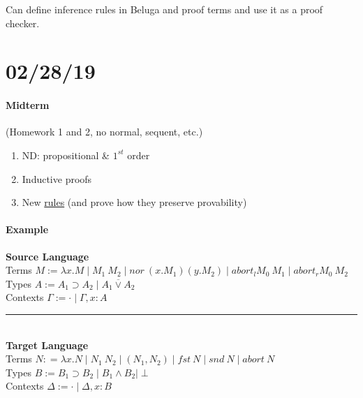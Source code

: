 \documentclass[12 pt]{article}
\begin{document}
       \DP

       Can define inference rules in Beluga and proof terms and use it
       as a proof checker.

       \section{02/28/19}
       \paragraph{Midterm} (Homework 1 and 2, no normal, sequent, etc.)
       \begin{enumerate}
       \item ND: propositional \& $1^{st}$ order
       \item Inductive proofs
       \item New \underline{rules} (and prove how they preserve
         provability)
       \end{enumerate}
       \paragraph{Example}
       \textbf{Source Language}
       \\ Terms $M := \lambda x. M \mid M_1 \ M_2 \mid nor\ (x.M_1)
       (y.M_2) \mid abort_l M_0 \ M_1 \mid abort_r M_0\ M_2$
       \\ Types $A := A_1 \supset A_2 \mid A_1 \overline{\lor} A_2$
       \\ Contexts $\Gamma := \cdot \mid \Gamma, x :A$
       \\ \noindent \rule{\textwidth}{0.5pt}
       \\ \textbf{Target Language}
       \\ Terms $N : = \lambda x.N \mid N_1\ N_2 \mid (N_1, N_2)
       \mid fst\ N \mid snd\ N \mid abort\ N$
       \\ Types $B:= B_1 \supset B_2 \mid B_1 \land B_2 \mid \perp$
       \\ Contexts $\Delta := \cdot \mid \Delta, x:B$
\end{document}
